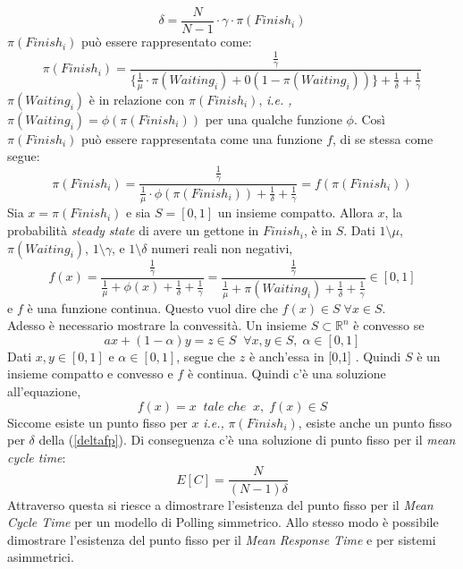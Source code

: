 \documentclass[12pt,a4paper,italian]{article}
\begin{document}
\begin{equation}
\delta = \frac{N}{N -1 }\cdot \gamma\cdot\pi(Finish_i)
\label{deltafp}
\end{equation}
$\pi(Finish_i)$ può essere rappresentato come:
\begin{equation}
\pi(Finish_i) = \frac{\frac{1}{\gamma}}{\{\frac{1}{\mu}\cdot\pi(Waiting_i)+0(1-\pi(Waiting_i))\}+\frac{1}{\delta}+\frac{1}{\gamma}}
\label{finish}
\end{equation}
$\pi(Waiting_i)$ è in relazione con $\pi(Finish_i)$, \emph{i.e. ,} $\pi(Waiting_i) = \phi(\pi(Finish_i))$ per una qualche funzione $\phi$. Così $\pi(Finish_i)$ può essere rappresentata come una funzione $f$, di se stessa come segue:
\begin{equation}
\pi(Finish_i) = \frac{\frac{1}{\gamma}}{\frac{1}{\mu}\cdot\phi(\pi(Finish_i))+\frac{1}{\delta}+\frac{1}{\gamma}} = f(\pi(Finish_i))
\label{fp}
\end{equation}
Sia $x= \pi(Finish_i)$ e sia $S = [0,1]$ un insieme compatto. Allora $x$, la probabilità \emph{steady state} di avere un gettone in $Finish_i$, è in $S$. Dati $1\setminus\mu$, $\pi(Waiting_i)$, $1\setminus\gamma$, e $1\setminus\delta$ numeri reali non negativi,
\begin{equation*}
f(x) = \frac{\frac{1}{\gamma}}{\frac{1}{\mu}+\phi(x)+\frac{1}{\delta}+\frac{1}{\gamma}} =  \frac{\frac{1}{\gamma}}{\frac{1}{\mu}+\pi(Waiting_i)+\frac{1}{\delta}+\frac{1}{\gamma}} \in [0,1]
\end{equation*}
e $f$ è una funzione continua. Questo vuol dire che $f(x) \in S \; \forall x \in S$.\\
\newline
Adesso è necessario mostrare la convessità. Un insieme $S \subset \mathbb{R}^n$ è convesso se
\begin{equation*}
ax + (1-\alpha)y = z \in S \; \; \forall x,y \in S, \; \alpha \in [0,1]
\end{equation*}
Dati $x,y \in [0,1]$ e $\alpha \in [0,1]$, segue che $z$ è anch'essa in [0,1] . Quindi $S$ è un insieme compatto e convesso e $f$ è continua. Quindi c'è una soluzione all'equazione,
\begin{equation*}
f(x) = x \;\;tale\; che\;\; x, \; f(x) \in S
\end{equation*} 
Siccome esiste un punto fisso per $x$ \emph{i.e.,} $\pi(Finish_i)$, esiste anche un punto fisso per $\delta$ della (\ref{deltafp}). Di conseguenza c'è una soluzione di punto fisso per il \emph{mean cycle time}: 
\begin{equation*}
	E[C] = \frac{N}{(N-1)\delta}
\end{equation*}
Attraverso questa si riesce a dimostrare l'esistenza del punto fisso per il \emph{Mean Cycle Time} per un modello di Polling simmetrico. Allo stesso modo è possibile dimostrare l'esistenza del punto fisso per il \emph{Mean Response Time} e per sistemi asimmetrici. 
\end{document}
